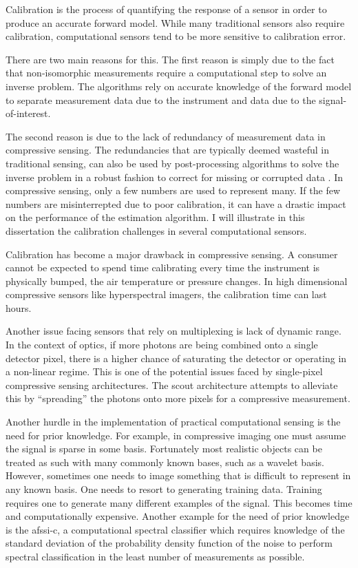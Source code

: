 Calibration is the process of quantifying the response of a sensor in order to produce an accurate forward model. While many traditional sensors also require calibration, computational sensors tend to be more sensitive to calibration error. 

There are two main reasons for this. The first reason is simply due to the fact that non-isomorphic measurements require a computational step to solve an inverse problem. The algorithms rely on accurate knowledge of the forward model to separate measurement data due to the instrument and data due to the signal-of-interest. 

The second reason is due to the lack of redundancy of measurement data in compressive sensing. The redundancies that are typically deemed wasteful in traditional sensing, can also be used by post-processing algorithms to solve the inverse problem in a robust fashion to correct for missing or corrupted data \cite{gehm2013calibration}. In \gls{compressive sensing}, only a few numbers are used to represent many. If the few numbers are misinterrepted due to poor calibration, it can have a drastic impact on the performance of the estimation algorithm. I will illustrate in this dissertation the calibration challenges in several computational sensors. 

Calibration has become a major drawback in compressive sensing. A consumer cannot be expected to spend time calibrating every time the instrument is physically bumped, the air temperature or pressure changes. In high dimensional compressive sensors like hyperspectral imagers, the calibration time can last hours.

Another issue facing sensors that rely on multiplexing is lack of dynamic range. In the context of optics, if more photons are being combined onto a single detector pixel, there is a higher chance of saturating the detector or operating in a non-linear regime. This is one of the potential issues faced by single-pixel compressive sensing architectures. The \gls{scout} architecture attempts to alleviate this by ``spreading'' the photons onto more pixels for a compressive measurement. 

Another hurdle in the implementation of practical computational sensing is the need for prior knowledge. For example, in \gls{compressive imaging} one must assume the signal is sparse in some basis. Fortunately most realistic objects can be treated as such with many commonly known bases, such as a wavelet basis. However, sometimes one needs to image something that is difficult to represent in any known basis. One needs to resort to generating training data.  Training requires one to generate many different examples of the signal. This becomes time and computationally expensive. Another example for the need of prior knowledge is the \gls{afssi-c}, a computational spectral classifier which requires knowledge of the standard deviation of the probability density function of the noise to perform spectral classification in the least number of measurements as possible.

